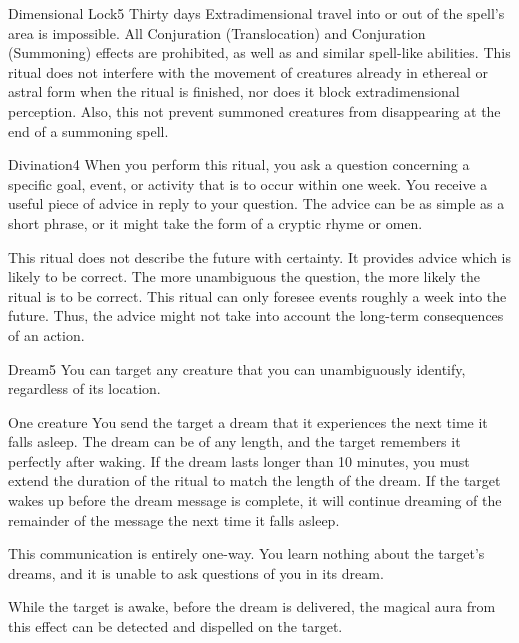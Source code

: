 \begin{spellsection}{Dimensional Lock}{5}
\spelldur Thirty days
\spellline
\spelleffect Extradimensional travel into or out of the spell's area is impossible. All Conjuration (Translocation) and Conjuration (Summoning) effects are prohibited, as well as  and similar spell-like abilities.
\spellnotes This ritual does not interfere with the movement of creatures already in ethereal or astral form when the ritual is finished, nor does it block extradimensional perception. Also, this not prevent summoned creatures from disappearing at the end of a summoning spell.
\end{spellsection}

\begin{spellsection}{Divination}{4}
\spellline
\spelleffect When you perform this ritual, you ask a question concerning a specific goal, event, or activity that is to occur within one week. You receive a useful piece of advice in reply to your question. The advice can be as simple as a short phrase, or it might take the form of a cryptic rhyme or omen. 

This ritual does not describe the future with certainty. It provides advice which is likely to be correct. The more unambiguous the question, the more likely the ritual is to be correct.
\spellnotes This ritual can only foresee events roughly a week into the future. Thus, the advice might not take into account the long-term consequences of an action.
\end{spellsection}

\begin{spellsection}{Dream}{5}
\spellspecial You can target any creature that you can unambiguously identify, regardless of its location.
\begin{spelltarget}{One creature}
    \spelleffect You send the target a dream that it experiences the next time it falls asleep. The dream can be of any length, and the target remembers it perfectly after waking. If the dream lasts longer than 10 minutes, you must extend the duration of the ritual to match the length of the dream. If the target wakes up before the dream message is complete, it will continue dreaming of the remainder of the message the next time it falls asleep.
\end{spelltarget}

\spellnotes This communication is entirely one-way. You learn nothing about the target's dreams, and it is unable to ask questions of you in its dream.

While the target is awake, before the dream is delivered, the magical aura from this effect can be detected and dispelled on the target.
\end{spellsection}

